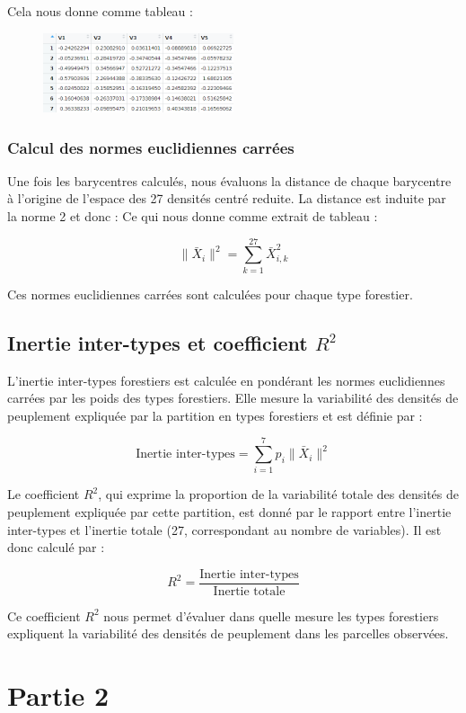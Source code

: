 \documentclass{article}
\begin{document}
Cela nous donne comme tableau :

\begin{figure}[h] 
    \centering
    \includegraphics[width=0.5\textwidth]{barycentre_forestier.png} 
\end{figure}


\subsubsection{Calcul des normes euclidiennes carrées}
Une fois les barycentres calculés, nous évaluons la distance de chaque barycentre à l'origine de l'espace des 27 densités centré reduite. La distance est induite par la norme 2 et donc :
Ce qui nous donne comme extrait de tableau : 

\[
\|\bar{X}_i\|^2 = \sum_{k=1}^{27} \bar{X}_{i,k}^2
\]

Ces normes euclidiennes carrées sont calculées pour chaque type forestier.

\subsection{Inertie inter-types et coefficient $R^2$}
L'inertie inter-types forestiers est calculée en pondérant les normes euclidiennes carrées par les poids des types forestiers. Elle mesure la variabilité des densités de peuplement expliquée par la partition en types forestiers et est définie par :

\[
\text{Inertie inter-types} = \sum_{i=1}^{7} p_i \|\bar{X}_i\|^2
\]

Le coefficient $R^2$, qui exprime la proportion de la variabilité totale des densités de peuplement expliquée par cette partition, est donné par le rapport entre l'inertie inter-types et l'inertie totale (27, correspondant au nombre de variables). Il est donc calculé par :

\[
R^2 = \frac{\text{Inertie inter-types}}{\text{Inertie totale}}
\]

Ce coefficient $R^2$ nous permet d'évaluer dans quelle mesure les types forestiers expliquent la variabilité des densités de peuplement dans les parcelles observées.

\newpage
\section{Partie 2}
\end{document}

